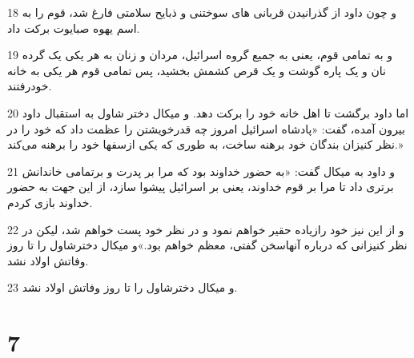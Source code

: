 \par 18 و چون داود از گذرانیدن قربانی های سوختنی و ذبایح سلامتی فارغ شد، قوم را به اسم یهوه صبایوت برکت داد.
\par 19 و به تمامی قوم، یعنی به جمیع گروه اسرائیل، مردان و زنان به هر یکی یک گرده نان و یک پاره گوشت و یک قرص کشمش بخشید، پس تمامی قوم هر یکی به خانه خودرفتند.
\par 20 اما داود برگشت تا اهل خانه خود را برکت دهد. و میکال دختر شاول به استقبال داود بیرون آمده، گفت: «پادشاه اسرائیل امروز چه قدرخویشتن را عظمت داد که خود را در نظر کنیزان بندگان خود برهنه ساخت، به طوری که یکی ازسفها خود را برهنه می‌کند.»
\par 21 و داود به میکال گفت: «به حضور خداوند بود که مرا بر پدرت و برتمامی خاندانش برتری داد تا مرا بر قوم خداوند، یعنی بر اسرائیل پیشوا سازد، از این جهت به حضور خداوند بازی کردم.
\par 22 و از این نیز خود رازیاده حقیر خواهم نمود و در نظر خود پست خواهم شد، لیکن در نظر کنیزانی که درباره آنهاسخن گفتی، معظم خواهم بود.»و میکال دخترشاول را تا روز وفاتش اولاد نشد.
\par 23 و میکال دخترشاول را تا روز وفاتش اولاد نشد.
 
\chapter{7}

